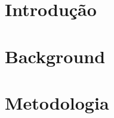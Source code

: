 \documentclass[a4paper,12pt,oneside,openany]{book}
\begin{document}
	

\frontmatter

\thispagestyle{empty}






\tableofcontents
\listoffigures
\listoftables

\mainmatter
\cleardoublepage
\chapter{Introdução}
\label{intro_cap1}


\chapter{Background}
	\label{background_cap2}
	
	
	

	\chapter{Metodologia}
	\label{Metodologia_cap3}
	

\normalsize
\cleardoublepage
{}


\end{document}
